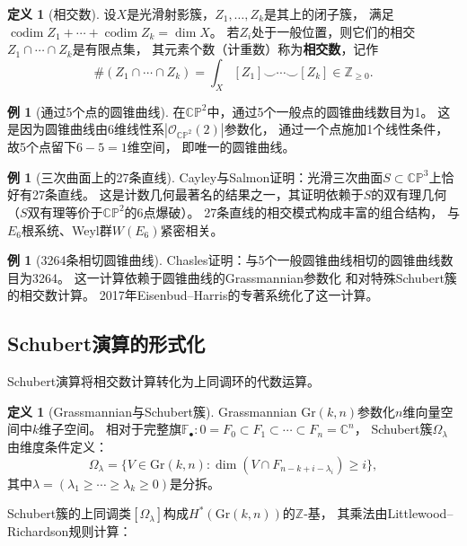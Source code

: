 \documentclass[11pt,a4paper]{article}
\theoremstyle{plain}
\theoremstyle{definition}
\newtheorem{definition}[theorem]{定义}
\newtheorem{example}[theorem]{例}
\newcommand{\C}{\mathbb{C}}
\newcommand{\Z}{\mathbb{Z}}
\newcommand{\CP}{\mathbb{CP}}
\newcommand{\F}{\mathbb{F}}
\newcommand{\Ocal}{\mathcal{O}}
\newcommand{\codim}{\operatorname{codim}}
\begin{document}
\begin{definition}[相交数]\label{def:intersect}
设$X$是光滑射影簇，$Z_1, \ldots, Z_k$是其上的闭子簇，
满足$\codim Z_1 + \cdots + \codim Z_k = \dim X$。
若$Z_i$处于一般位置，则它们的相交$Z_1 \cap \cdots \cap Z_k$是有限点集，
其元素个数（计重数）称为\textbf{相交数}，记作
\[
\#(Z_1 \cap \cdots \cap Z_k) = \int_X [Z_1] \smile \cdots \smile [Z_k] \in \Z_{\geq 0}.
\]
\end{definition}

\begin{example}[通过5个点的圆锥曲线]\label{ex:5conics}
在$\CP^2$中，通过5个一般点的圆锥曲线数目为1。
这是因为圆锥曲线由6维线性系$|\Ocal_{\CP^2}(2)|$参数化，
通过一个点施加1个线性条件，故5个点留下$6-5=1$维空间，
即唯一的圆锥曲线。
\end{example}

\begin{example}[三次曲面上的27条直线]\label{ex:27lines}
Cayley与Salmon证明：光滑三次曲面$S \subset \CP^3$上恰好有27条直线。
这是计数几何最著名的结果之一，其证明依赖于$S$的双有理几何
（$S$双有理等价于$\CP^2$的6点爆破）。
27条直线的相交模式构成丰富的组合结构，
与$E_6$根系统、Weyl群$W(E_6)$紧密相关。
\end{example}

\begin{example}[3264条相切圆锥曲线]\label{ex:3264}
Chasles证明：与5个一般圆锥曲线相切的圆锥曲线数目为3264。
这一计算依赖于圆锥曲线的Grassmannian参数化
和对特殊Schubert簇的相交数计算。
2017年Eisenbud--Harris的专著\cite{EH2016}系统化了这一计算。
\end{example}

\subsection{Schubert演算的形式化}

Schubert演算将相交数计算转化为上同调环的代数运算。

\begin{definition}[Grassmannian与Schubert簇]\label{def:grassmannian}
Grassmannian $\mathrm{Gr}(k, n)$参数化$n$维向量空间中$k$维子空间。
相对于完整旗$\F_\bullet: 0 = F_0 \subset F_1 \subset \cdots \subset F_n = \C^n$，
Schubert簇$\Omega_\lambda$由维度条件定义：
\[
\Omega_\lambda = \{V \in \mathrm{Gr}(k,n) : \dim(V \cap F_{n-k+i-\lambda_i}) \geq i\},
\]
其中$\lambda = (\lambda_1 \geq \cdots \geq \lambda_k \geq 0)$是分拆。
\end{definition}

Schubert簇的上同调类$[\Omega_\lambda]$构成$H^*(\mathrm{Gr}(k,n))$的$\Z$-基，
其乘法由Littlewood--Richardson规则计算：
\end{document}

